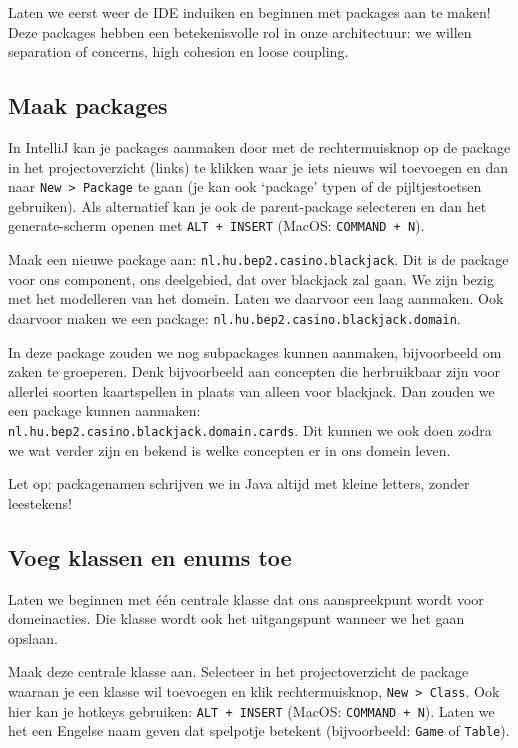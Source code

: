 Laten we eerst weer de IDE induiken en beginnen met packages aan te maken!
Deze packages hebben een betekenisvolle rol in onze architectuur: 
we willen separation of concerns, high cohesion en loose coupling.

\subsection{Maak packages}
In IntelliJ kan je packages aanmaken door met de rechtermuisknop op de package
in het projectoverzicht (links) te klikken waar je iets nieuws wil toevoegen
en dan naar \texttt{New > Package} te gaan 
(je kan ook `package' typen of de pijltjestoetsen gebruiken). 
Als alternatief kan je ook de parent-package selecteren en dan 
het generate-scherm openen met \texttt{ALT + INSERT} (MacOS: \texttt{COMMAND + N}). 

Maak een nieuwe package aan: \texttt{nl.hu.bep2.casino.blackjack}.
Dit is de package voor ons component, ons deelgebied, dat over blackjack zal gaan.
We zijn bezig met het modelleren van het domein. Laten we daarvoor een laag aanmaken.
Ook daarvoor maken we een package: \texttt{nl.hu.bep2.casino.blackjack.domain}.

In deze package zouden we nog subpackages kunnen aanmaken, bijvoorbeeld om zaken te groeperen.
Denk bijvoorbeeld aan concepten die herbruikbaar zijn voor allerlei soorten kaartspellen 
in plaats van alleen voor blackjack. Dan zouden we een package kunnen aanmaken: 
\\ \texttt{nl.hu.bep2.casino.blackjack.domain.cards}. Dit kunnen we ook doen zodra we 
wat verder zijn en bekend is welke concepten er in ons domein leven.

Let op: packagenamen schrijven we in Java altijd met kleine letters,
zonder leestekens!

\subsection{Voeg klassen en enums toe}
Laten we beginnen met één centrale klasse dat ons aanspreekpunt wordt
voor domeinacties. Die klasse wordt ook het uitgangspunt wanneer we het gaan opslaan.

Maak deze centrale klasse aan. Selecteer in het projectoverzicht de 
package waaraan je een klasse wil toevoegen en klik rechtermuisknop, \texttt{New > Class}. 
Ook hier kan je hotkeys gebruiken: \texttt{ALT + INSERT} (MacOS: \texttt{COMMAND + N}).
Laten we het een Engelse naam geven dat spelpotje betekent (bijvoorbeeld: \texttt{Game} of \texttt{Table}).

